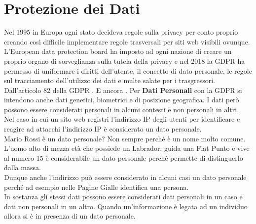 \section{Protezione dei Dati}
\label{sec:dataprotection}
Nel 1995 in Europa ogni stato decideva regole sulla privacy per conto proprio creando così difficile implementare regole trasversali per siti web visibili ovunque.
L'European data protection board ha imposto ad ogni nazione di creare un proprio organo di sorveglianza sulla tutela della privacy e nel 2018 la \acrshort{GDPR} ha permesso di uniformare i diritti dell'utente, il concetto di dato personale, le regole sul tracciamento dell'utilizzo dei dati e multe salate per i trasgressori.
Dall'articolo 82 della \acrshort{GDPR} .
E ancora .
Per \textbf{Dati Personali} con la \acrshort{GDPR} si intendono anche dati genetici, biometrici e di posizione geografica.
I dati però possono essere considerati personali in alcuni contesti e non personali in altri.\\
Nel caso in cui un sito web registri l'indirizzo IP degli utenti per identificare e reagire ad attacchi l'indirizzo IP è considerato un dato personale.\\
Mario Rossi è un dato personale? Non sempre perché è un nome molto comune.\\
L'uomo alto di mezza età che possiede un Labrador, guida una Fiat Punto e vive al numero 15 è considerabile un dato personale perché permette di distinguerlo dalla massa.\\
Dunque anche l'indirizzo può essere considerato in alcuni casi un dato personale perché ad esempio nelle Pagine Gialle identifica una persona.\\
In sostanza gli stessi dati possono essere considerati dati personali in un caso e dati non personali in un altro.
Quando un'informazione è legata ad un individuo allora si è in presenza di un dato personale.

